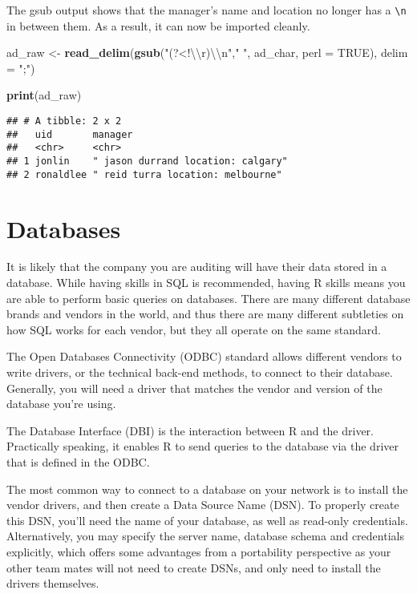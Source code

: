 \documentclass[
]{book}
\newenvironment{Shaded}{\begin{snugshade}}{\end{snugshade}}
\newcommand{\CharTok}[1]{\textcolor[rgb]{0.31,0.60,0.02}{#1}}
\newcommand{\DataTypeTok}[1]{\textcolor[rgb]{0.13,0.29,0.53}{#1}}
\newcommand{\KeywordTok}[1]{\textcolor[rgb]{0.13,0.29,0.53}{\textbf{#1}}}
\newcommand{\NormalTok}[1]{#1}
\newcommand{\OtherTok}[1]{\textcolor[rgb]{0.56,0.35,0.01}{#1}}
\newcommand{\StringTok}[1]{\textcolor[rgb]{0.31,0.60,0.02}{#1}}
\begin{document}
The gsub output shows that the manager's name and location no longer has a \texttt{\textbackslash{}n} in between them. As a result, it can now be imported cleanly.

\begin{Shaded}
\begin{Highlighting}[]
\NormalTok{ad_raw <-}\StringTok{ }\KeywordTok{read_delim}\NormalTok{(}\KeywordTok{gsub}\NormalTok{(}\StringTok{"(?<!}\CharTok{\textbackslash{}\textbackslash{}}\StringTok{r)}\CharTok{\textbackslash{}\textbackslash{}}\StringTok{n"}\NormalTok{,}\StringTok{" "}\NormalTok{, ad_char, }\DataTypeTok{perl =} \OtherTok{TRUE}\NormalTok{), }\DataTypeTok{delim =} \StringTok{";"}\NormalTok{)}

\KeywordTok{print}\NormalTok{(ad_raw)}
\end{Highlighting}
\end{Shaded}

\begin{verbatim}
## # A tibble: 2 x 2
##   uid       manager                           
##   <chr>     <chr>                             
## 1 jonlin    " jason durrand location: calgary"
## 2 ronaldlee " reid turra location: melbourne"
\end{verbatim}

\hypertarget{import-db}{%
\section{Databases}\label{import-db}}

It is likely that the company you are auditing will have their data stored in a database. While having skills in SQL is recommended, having R skills means you are able to perform basic queries on databases. There are many different database brands and vendors in the world, and thus there are many different subtleties on how SQL works for each vendor, but they all operate on the same standard.

The Open Databases Connectivity (ODBC) standard allows different vendors to write drivers, or the technical back-end methods, to connect to their database. Generally, you will need a driver that matches the vendor and version of the database you're using.

The Database Interface (DBI) is the interaction between R and the driver. Practically speaking, it enables R to send queries to the database via the driver that is defined in the ODBC.

The most common way to connect to a database on your network is to install the vendor drivers, and then create a Data Source Name (DSN). To properly create this DSN, you'll need the name of your database, as well as read-only credentials. Alternatively, you may specify the server name, database schema and credentials explicitly, which offers some advantages from a portability perspective as your other team mates will not need to create DSNs, and only need to install the drivers themselves.
\end{document}
